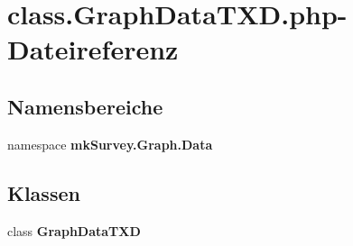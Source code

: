 \section{class.GraphDataTXD.php-Dateireferenz}
\label{class_8GraphDataTXD_8php}
\subsection*{Namensbereiche}
\begin{CompactItemize}
\item 
namespace {\bf mkSurvey.Graph.Data}
\end{CompactItemize}
\subsection*{Klassen}
\begin{CompactItemize}
\item 
class {\bf GraphDataTXD}
\end{CompactItemize}
